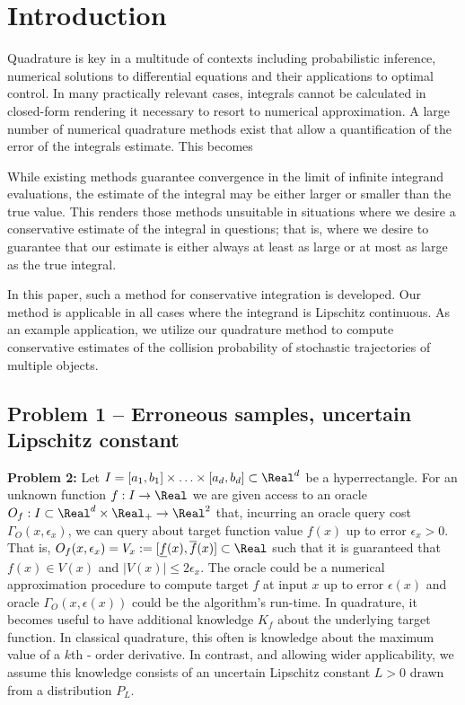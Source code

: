 \section{Introduction} Quadrature is key in a multitude of contexts including
probabilistic inference, numerical solutions to differential equations and their applications to optimal control. In many practically relevant
cases, integrals cannot be calculated in closed-form rendering it
necessary to resort to numerical approximation. 
A large number of numerical quadrature methods exist that allow a quantification of the error of the integrals estimate. This becomes 

While existing
methods guarantee convergence in the limit of infinite integrand
evaluations, the estimate of the integral may be either larger or
smaller than the true value. This renders those methods unsuitable
in situations where we desire a conservative estimate of the
integral in questions; that is, where we desire to guarantee that
our estimate is either always at least as large or at most as large
as the true integral.

In this paper, such a method for conservative integration is
developed. Our method is applicable in all cases where the integrand
is Lipschitz continuous. As an example application, we utilize our
quadrature method to compute conservative estimates of the collision
probability of stochastic trajectories of multiple objects.

\subsection{Problem 1 -- Erroneous samples, uncertain Lipschitz constant}
\textbf{Problem 2:} Let $I=[a_1,b_1] \times \ldots \times [a_d,b_d] \subset \Real^d$ be a hyperrectangle. For an unknown function $f: I \to \Real$ we are given access to an oracle $O_f:  I \subset \Real^d \times \Real_+ \to \Real^2$ that, incurring  an oracle query cost $\Gamma_O(x,\epsilon_x)$, we can query about target function value $f(x)$ up to error $\epsilon_x > 0$. That is, $O_f(x,\epsilon_x) = V_x := [\underline f(x), \overline f(x)] \subset \Real$ such that it is guaranteed that $f(x) \in V(x) $ and $|V(x)| \leq 2 \epsilon_x$. The oracle could be a numerical approximation procedure to compute target $f$ at input $x$ up to error $\epsilon(x)$ and oracle $\Gamma_O(x,\epsilon(x) )$ could be the algorithm's run-time. In quadrature, it becomes useful to have additional knowledge $K_f$ about the underlying target function. In classical quadrature, this often is knowledge about the maximum value of a $k$th - order derivative.  
In contrast, and allowing wider applicability, we assume this knowledge consists of an uncertain Lipschitz constant $L >0$ drawn from a distribution $P_L$.

